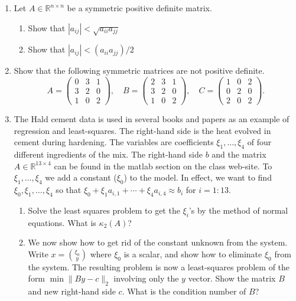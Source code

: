 \documentclass[11pt]{article}
\newcommand{\R}{\mathbb{R}}
\begin{document}
\begin{enumerate}
	\item Let \(A \in \R^{n \times n}\) be a symmetric positive definite matrix.
	      \begin{enumerate}
		      \item Show that \(|a_{ij}| < \sqrt{a_{ii}a_{jj}}\)

		      \item Show that \(|a_{ij}| < (a_{ii}a_{jj})/2\)
	      \end{enumerate}

	\item Show that the following symmetric matrices are not positive definite.
	      \[
		      A = \begin{pmatrix} 0 & 3 & 1 \\ 3 & 2 & 0 \\ 1 & 0 & 2 \end{pmatrix}, \quad
		      B = \begin{pmatrix} 2 & 3 & 1 \\ 3 & 2 & 0 \\ 1 & 0 & 2 \end{pmatrix}, \quad
		      C = \begin{pmatrix} 1 & 0 & 2 \\ 0 & 2 & 0 \\ 2 & 0 & 2 \end{pmatrix}.
	      \]

	\item The Hald cement data is used in several books and papers as an example of regression and least-squares.  The right-hand side is the heat evolved in cement during hardening.  The variables are coefficients \(\xi_1, \dots, \xi_4\) of four different ingredients of the mix.  The right-hand side \(b\) and the matrix \(A \in \R^{13 \times 4}\) can be found in the matlab section on the class web-site.  To \(\xi_1, \dots, \xi_4\) we add a constant (\(\xi_0\)) to the model.  In effect, we want to find \(\xi_0, \xi_1, \dots, \xi_4\) so that \(\xi_0 + \xi_1 a_{i,1} + \cdots + \xi_4 a_{i,4} \approx b_i\) for \(i=1:13\).
	      \begin{enumerate}
		      \item Solve the least squares problem to get the \(\xi_i\)'s by the method of normal equations.  What is \(\kappa_2(A)\)?

		      \item We now show how to get rid of the constant unknown from the system.  Write \(x = \binom{\xi_0}{y}\) where \(\xi_0\) is a scalar, and show how to eliminate \(\xi_0\) from the system.  The resulting problem is now a least-squares problem of the form \(\min \lVert By-c \rVert_2\) involving only the \(y\) vector.  Show the matrix \(B\) and new right-hand side \(c\).  What is the condition number of \(B\)?


\end{enumerate}
\end{enumerate}
\end{document}
